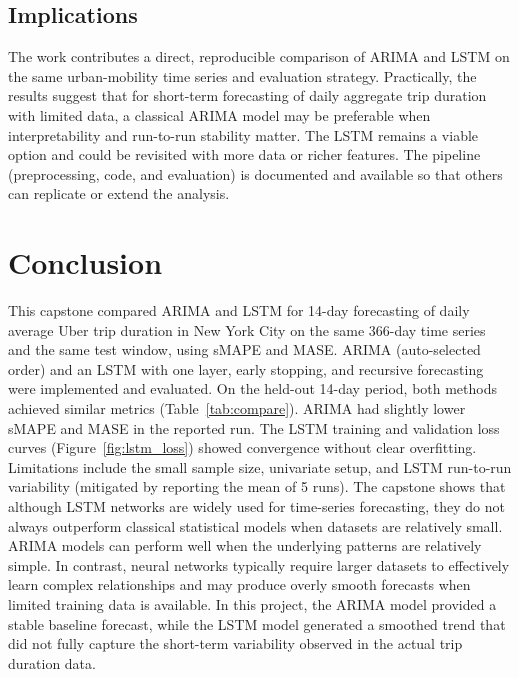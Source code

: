 \documentclass[12pt, a4paper]{article}
\begin{document}
\subsection{Implications}

The work contributes a direct, reproducible comparison of ARIMA and LSTM on the same urban-mobility time series and evaluation strategy. Practically, the results suggest that for short-term forecasting of daily aggregate trip duration with limited data, a classical ARIMA model may be preferable when interpretability and run-to-run stability matter. The LSTM remains a viable option and could be revisited with more data or richer features. The pipeline (preprocessing, code, and evaluation) is documented and available so that others can replicate or extend the analysis. 

\section{Conclusion}

This capstone compared ARIMA and LSTM for 14-day forecasting of daily average Uber trip duration in New York City on the same 366-day time series and the same test window, using sMAPE and MASE. ARIMA (auto-selected order) and an LSTM with one layer, early stopping, and recursive forecasting were implemented and evaluated. On the held-out 14-day period, both methods achieved similar metrics (Table~\ref{tab:compare}). ARIMA had slightly lower sMAPE and MASE in the reported run. The LSTM training and validation loss curves (Figure~\ref{fig:lstm_loss}) showed convergence without clear overfitting. Limitations include the small sample size, univariate setup, and LSTM run-to-run variability (mitigated by reporting the mean of 5 runs). The capstone shows that although LSTM networks are widely used for time-series forecasting, they do not always outperform classical statistical models when datasets are relatively small. ARIMA models can perform well when the underlying patterns are relatively simple. In contrast, neural networks typically require larger datasets to effectively learn complex relationships and may produce overly smooth forecasts when limited training data is available. In this project, the ARIMA model provided a stable baseline forecast, while the LSTM model generated a smoothed trend that did not fully capture the short-term variability observed in the actual trip duration data.
\end{document}
